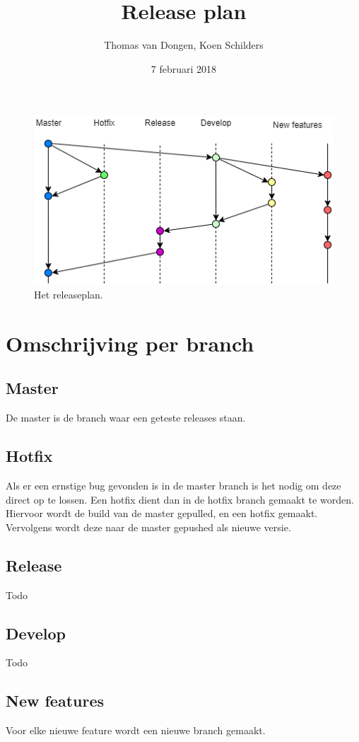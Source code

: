 \documentclass[12pt]{article}
\title{Release plan}
\author{Thomas van Dongen, Koen Schilders}
\date{7 februari 2018}
\begin{document}
\begin{titlepage}
\maketitle
\end{titlepage}

\begin{figure}
	\includegraphics[width=\textwidth]{images/SOP6_Release.png}
	\caption{Het releaseplan.}
\end{figure}

\section{Omschrijving per branch}
\subsection{Master}
De master is de branch waar een geteste releases staan.
\subsection{Hotfix}
Als er een ernstige bug gevonden is in de master branch is het nodig om deze direct op te lossen. Een hotfix dient dan in de hotfix branch gemaakt te worden. Hiervoor wordt de build van de master gepulled, en een hotfix gemaakt. Vervolgens wordt deze naar de master gepushed als nieuwe versie.
\subsection{Release}
Todo
\subsection{Develop}
Todo
\subsection{New features}
Voor elke nieuwe feature wordt een nieuwe branch gemaakt.
\end{document}
